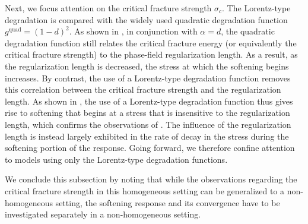 Next, we focus attention on the critical fracture strength $\sigma_c$. The Lorentz-type degradation is compared with the widely used quadratic degradation function $g^\text{quad} = (1-d)^2$.
As shown in , in conjunction with $\alpha = d$, the quadratic degradation function still relates the critical fracture energy (or equivalently the critical fracture strength) to the phase-field regularization length.  As a result, as the regularization length is decreased, the stress at which the softening begins increases.
By contrast, the use of a Lorentz-type degradation function removes this correlation between the critical fracture strength and the regularization length.  As shown in , the use of a Lorentz-type degradation function thus gives rise to softening that begins at a stress that is insensitive to the regularization length, which confirms the observations of \cite{brandon2020cohesive}.
The influence of the regularization length is instead largely exhibited in the rate of decay in the stress during the softening portion of the response.  Going forward, we therefore confine attention to models using only the Lorentz-type degradation functions.



We conclude this subsection by noting that while the observations regarding the critical fracture strength in this homogeneous setting can be generalized to a non-homogeneous setting, the softening response and its convergence have to be investigated separately in a non-homogeneous setting.

